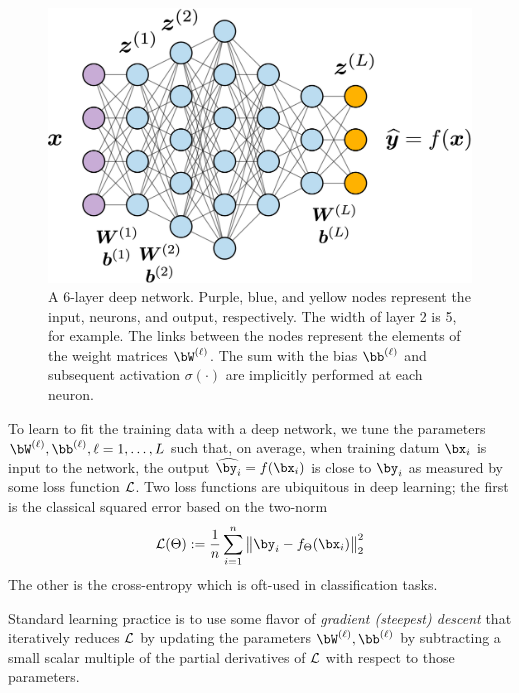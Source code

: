 \documentclass{notices}
\begin{document}
\begin{figure}[h]
\centering
\includegraphics[width=1\linewidth]{Figs/deepnet4.png}
\vspace*{-4mm}
    \caption{\small
    A 6-layer deep network.
    Purple, blue, and yellow nodes represent the input, neurons, and output, respectively.     
    The width of layer 2 is 5, for example.
    The links between the nodes represent the elements of the weight matrices $\bW^{(\ell)}$.
    The sum with the bias $\bb^{(\ell)}$ and subsequent  activation $\sigma(\cdot)$ are implicitly performed at each neuron.}
    \label{fig:deepNet}
\end{figure}


To learn to fit the training data with a deep network, we tune the parameters $\bW^{(\ell)},\bb^{(\ell)}, \ell=1,\dots,L$ such that, on average, when training datum $\bx_i$ is input to the network, the output $\widehat{\by_i}=f(\bx_i)$ is close to $\by_i$ as measured by some loss function ${\cal L}$.
Two loss functions are ubiquitous in deep learning; the first is the classical squared error based on the two-norm
\begin{equation}
{\cal L}(\Theta) :=
\frac{1}{n}
\sum_{i=1}^n \big\| \by_i - f_\Theta(\bx_i) \big\|_2^2
\label{eq:squared-loss}
\end{equation}
The other is the cross-entropy which is oft-used in classification tasks.


Standard learning practice is to use some flavor of {\em gradient (steepest) descent} that iteratively reduces ${\cal L}$ by updating the parameters $\bW^{(\ell)},\bb^{(\ell)}$ by subtracting a small scalar multiple of the partial derivatives of ${\cal L}$ with respect to those parameters.
\end{document}
